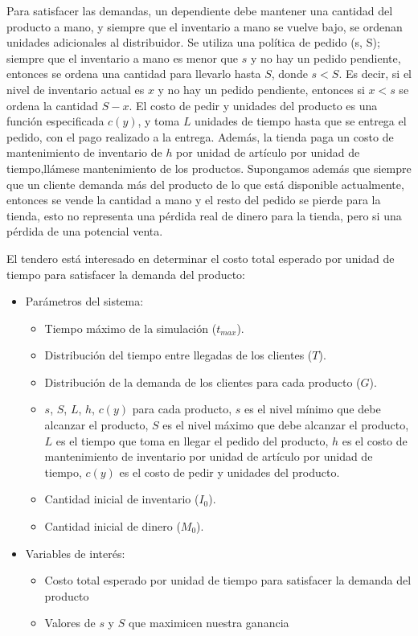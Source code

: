 \documentclass{article}
\begin{document}
Para satisfacer las demandas, un dependiente debe mantener una cantidad del producto a mano, y siempre que el inventario a
mano se vuelve bajo, se ordenan unidades adicionales al distribuidor. Se utiliza una política de pedido (s, S); siempre que el inventario a mano es menor que $s$ y no hay un pedido pendiente, entonces se ordena una cantidad para llevarlo hasta $S$, donde $s<S$. Es decir, si el nivel de inventario actual es $x$ y no hay un
pedido pendiente, entonces si $x<s$ se ordena la cantidad $S-x$.
El costo de pedir y unidades del producto es una función especificada $c(y)$, y toma $L$ unidades de tiempo hasta que se
entrega el pedido, con el pago realizado a la entrega. Además, la tienda paga un costo de mantenimiento de inventario de
$h$ por unidad de artículo por unidad de tiempo,llámese mantenimiento de los productos.
Supongamos además que siempre que un cliente demanda más del producto de lo que está disponible actualmente, entonces se
vende la cantidad a mano y el resto del pedido se pierde para la tienda, esto no representa una pérdida real de dinero para la tienda, pero si una pérdida de una potencial venta.

El tendero está interesado en determinar el costo total esperado por unidad de tiempo para satisfacer la demanda del
producto:


\begin{itemize}

    \item Parámetros del sistema:
    \begin{itemize}
        \item  Tiempo máximo de la simulación ($t_{max}$).
        \item  Distribución del tiempo entre llegadas de los clientes ($T$).
        \item  Distribución de la demanda de los clientes para cada producto ($G$).
        \item  $s$, $S$, $L$, $h$, $c(y)$ para cada producto, $s$ es el nivel mínimo que debe alcanzar el producto, $S$ es el nivel máximo que debe alcanzar el producto, $L$ es el tiempo que toma en llegar el pedido del producto, $h$ es el costo de mantenimiento de inventario por unidad de artículo por unidad de tiempo, $c(y)$ es el costo de pedir y unidades del producto.
        \item Cantidad inicial de inventario ($I_0$).
        \item Cantidad inicial de dinero ($M_0$).
     \end{itemize}


    \item Variables de interés:
    \begin{itemize}
        \item Costo total esperado por unidad de tiempo para satisfacer la demanda del producto
        \item Valores de $s$ y $S$ que maximicen nuestra ganancia
    \end{itemize}
\end{itemize}
\end{document}
